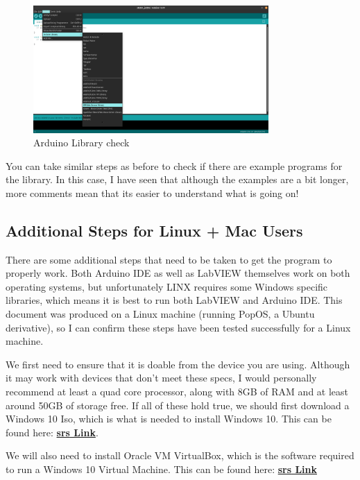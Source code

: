 \documentclass[a4paper,11pt]{report}
\let\oldhref\href %
\renewcommand{\href}[2]{\oldhref{#1}{\bf\gls{srs} #2}}
\begin{document}
\begin{figure}[H]
\centering
\includegraphics[width=0.8\textwidth]{screenshots/arduinolibraryinstallcheck}
\caption{Arduino Library check}
\end{figure}

You can take similar steps as before to check if there are example programs for the library. In this case, I have seen that although the examples are a bit longer, more comments mean that its easier to understand what is going on!

\subsection{Additional Steps for Linux + Mac Users}

There are some additional steps that need to be taken to get the program to properly work. Both Arduino IDE as well as LabVIEW themselves work on both operating systems, but unfortunately LINX requires some Windows specific libraries, which means it is best to run both LabVIEW and Arduino IDE. This document was produced on a Linux machine (running PopOS, a Ubuntu derivative), so I can confirm these steps have been tested successfully for a Linux machine.

We first need to ensure that it is doable from the device you are using. Although it may work with devices that don't meet these specs, I would personally recommend at least a quad core processor, along with 8GB of RAM and at least around 50GB of storage free. If all of these hold true, we should first download a Windows 10 Iso, which is what is needed to install Windows 10. This can be found here: \href{https://www.microsoft.com/en-gb/software-download/windows10ISO}{Link}.

We will also need to install Oracle VM VirtualBox, which is the software required to run a Windows 10 Virtual Machine. This can be found here: \href{https://www.virtualbox.org/}{Link}
\end{document}
